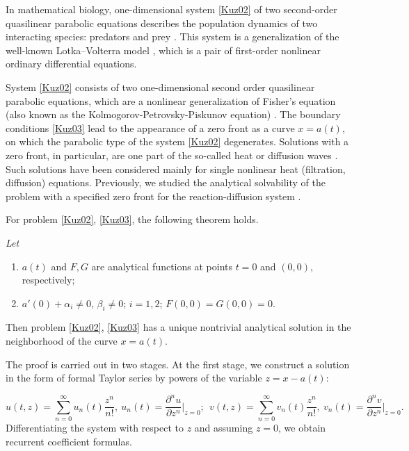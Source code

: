 \documentclass[12pt]{llncs}
\begin{document}
In mathematical biology, one-dimensional system \eqref{Kuz02} of two second-order quasilinear para\-bo\-lic equations describes the population dynamics of two interacting species: predators and prey \cite{Mur2003}. This system is a generalization of the well-known Lotka–Volterra model \cite{Arn2012}, which is a pair of first-order nonlinear ordinary differential equations.

System \eqref{Kuz02} consists of two one-dimensional second order quasilinear parabolic equations, which are a nonlinear generalization of Fisher's equation (also known as the Kolmogorov-Petrovsky-Piskunov equation) \cite{Kolm1937}. The boundary conditions \eqref{Kuz03} lead to the appearance of a zero front as a curve $x=a(t)$, on which the parabolic type of the system \eqref{Kuz02} degenerates. Solutions with a zero front, in particular, are one part of the so-called heat or diffusion waves \cite{Sam1987}. Such solutions have been considered mainly for single nonlinear heat (filtration, diffusion) equations. Previously, we studied the analytical solvability of the problem with a specified zero front for the reaction-diffusion system \cite{KazKuzSpev2021}.

For problem \eqref{Kuz02}, \eqref{Kuz03}, the following theorem holds.


\newpage

 {\it Let
	\begin{enumerate}
		\item $a(t)$ and $F,G$ are analytical functions at points $t=0$ and $(0,0)$, respectively;
		\item $a'(0)+\alpha_{i}\neq0$, $\beta_{i}\neq0$; $i=1,2$; $F(0,0)=G(0,0)=0$.
	\end{enumerate}
	Then problem \eqref{Kuz02}, \eqref{Kuz03} has a unique nontrivial analytical solution in the neighborhood of the curve $x=a(t)$.}

The proof is carried out in two stages. At the first stage, we construct a solution in the form of formal Taylor series by powers of the variable $z=x-a(t)$:

\begin{equation}\label{Kuz06}
u(t,z)=\sum\limits_{n=0}^{\infty}u_n(t)\frac{z^n}{n!},~u_n(t)=\frac{\partial^nu}{\partial z^n}\Big|_{z=0}; ~~v(t,z)=\sum\limits_{n=0}^{\infty}v_n(t)\frac{z^n}{n!},~v_n(t)=\frac{\partial^nv}{\partial z^n}\Big|_{z=0}.
\end{equation}
Differentiating the system with respect to $z$ and assuming $z=0$, we obtain recurrent coefficient formulas.
\end{document}
